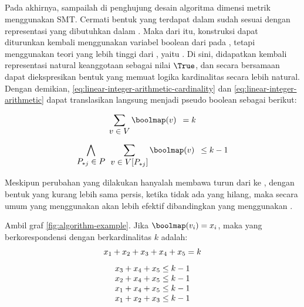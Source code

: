 \subsection{}

Pada akhirnya, sampailah di penghujung desain algoritma dimensi metrik menggunakan SMT. Cermati bentuk  yang terdapat dalam  sudah sesuai dengan representasi  yang dibutuhkan dalam . Maka dari itu, konstruksi  dapat diturunkan kembali menggunakan variabel boolean dari pada , tetapi menggunakan teori yang lebih tinggi dari , yaitu . Di sini, didapatkan kembali representasi natural keanggotaan sebagai nilai \(\True\), dan secara bersamaan dapat diekspresikan bentuk  yang memuat logika kardinalitas secara lebih natural. Dengan demikian, \autoref{eq:linear-integer-arithmetic-cardinality} dan \autoref{eq:linear-integer-arithmetic} dapat translasikan langsung menjadi pseudo boolean sebagai berikut:

\begin{equation}
	\sum \limits_{\displaystyle v \in V} \boolmap(v) \enspace = k
	\label{eq:pseudo-boolean-cardinality}
\end{equation}

\begin{equation}
	\bigwedge \limits_{\displaystyle P_{*j} \in P} \enspace \sum \limits_{\displaystyle v \in V[P_{*j}]} \boolmap(v) \enspace \leq k - 1
	\label{eq:pseudo-boolean}
\end{equation}

Meskipun perubahan yang dilakukan hanyalah membawa turun dari  ke , dengan bentuk  yang kurang lebih sama persis, ketika tidak ada  yang hilang, maka secara umum  yang menggunakan  akan lebih efektif dibandingkan yang menggunakan .

\begin{example}
	Ambil graf \autoref{fig:algorithm-example}. Jika \(\boolmap(v_i) = x_i\), maka  yang berkorespondensi dengan  berkardinalitas \(k\) adalah:
	\[
		\smash[b]{
		\begin{array}{c}
			x_1 + x_2 + x_3 + x_4 + x_5 = k \\ [8pt]
			x_3 + x_4 + x_5 \leq k - 1 \\
			x_2 + x_4 + x_5 \leq k - 1 \\
			x_1 + x_4 + x_5 \leq k - 1 \\
			x_1 + x_2 + x_3 \leq k - 1
		\end{array}
		} \vspace{.6em}
	\]
	\label{ex:pseudo-boolean-constraint}
\end{example}


